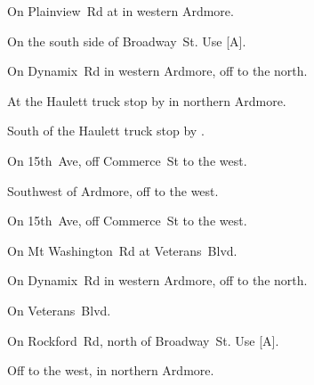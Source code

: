 
\begin{LocationList}

On Plainview~Rd at  in western Ardmore.

On the south side of Broadway~St.
Use  [A].

On Dynamix~Rd in western Ardmore, off  to the north.

At the Haulett truck stop by   in northern Ardmore.

South of the Haulett truck stop by  .

On 15th~Ave, off  Commerce~St to the west.

Southwest of Ardmore, off   to the west.

\Location{\RecruitmentAgency \Recruitment}
On 15th~Ave, off  Commerce~St to the west.

On Mt Washington~Rd at  Veterans~Blvd.

On Dynamix~Rd in western Ardmore, off  to the north.

On  Veterans~Blvd.

On Rockford~Rd, north of Broadway~St.
Use  [A].

Off   to the west, in northern Ardmore.

\end{LocationList}
